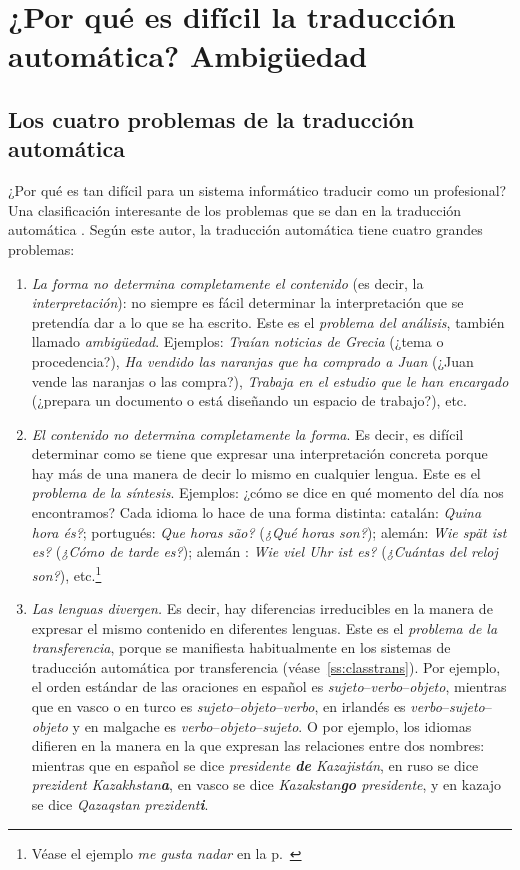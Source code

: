 \chapter[¿Por qué es difícil la TA? Ambigüedad]{¿Por qué es difícil la traducción automática? Ambigüedad} \label{se:ambig} 

\section{Los cuatro problemas de la traducción automática} ¿Por qué es tan difícil para un sistema informático traducir como un profesional? Una clasificación interesante de los problemas que se dan en la traducción automática \cite{arnold03p}. Según este autor, la traducción automática tiene cuatro grandes problemas: \begin{enumerate} \item \emph{La forma no determina completamente el contenido} (es decir, la \emph{interpretación}): no siempre es fácil determinar la interpretación que se pretendía dar a lo que se ha escrito. Este es el \emph{problema del análisis}, también llamado \emph{ambigüedad}. Ejemplos: \emph{Traían noticias de Grecia} (¿tema o procedencia?), \emph{Ha vendido las naranjas que ha comprado a Juan} (¿Juan vende las naranjas o las compra?), \emph{Trabaja en el estudio que le han encargado} (¿prepara un documento o está diseñando un espacio de trabajo?), etc. 

\item \emph{El contenido no determina completamente la forma}. Es decir, es difícil determinar como se tiene que expresar una interpretación concreta porque hay más de una manera de decir lo mismo en cualquier lengua. Este es el \emph{problema de la síntesis}. Ejemplos: ¿cómo se dice en qué momento del día nos encontramos? Cada idioma lo hace de una forma distinta: catalán: \emph{Quina hora és?}; portugués: \emph{Que horas são?} (\emph{¿Qué horas son?}); alemán: \emph{Wie spät ist es?} (\emph{¿Cómo de tarde es?}); alemán : \emph{Wie viel Uhr ist es?} (\emph{¿Cuántas del reloj son?}), etc.\footnote{Véase el ejemplo \emph{me gusta nadar} en la p.~\pageref{pg:magradanadar}} 

\item \emph{Las lenguas divergen.} Es decir, hay diferencias irreducibles en la manera de expresar el mismo contenido en diferentes lenguas. Este es el \emph{problema de la transferencia}, porque se manifiesta habitualmente en los sistemas de traducción automática por transferencia (véase~\ref{ss:classtrans}). Por ejemplo, el orden estándar de las oraciones en español es \emph{sujeto}--\emph{verbo}--\emph{objeto}, mientras que en vasco o en turco es \emph{sujeto}--\emph{objeto}--\emph{verbo}, en irlandés es \emph{verbo}--\emph{sujeto}--\emph{objeto} y en malgache es \emph{verbo}--\emph{objeto}--\emph{sujeto}. O por ejemplo, los idiomas difieren en la manera en la que expresan las relaciones entre dos nombres: mientras que en español se dice \emph{presidente \textbf{de} Kazajistán}, en ruso se dice \emph{prezident Kazakhstan\textbf{a}}, en vasco se dice \emph{Kazakstan\textbf{go} presidente}, y en kazajo se dice \emph{Qazaqstan prezident\textbf{i}}. 


\end{enumerate}
